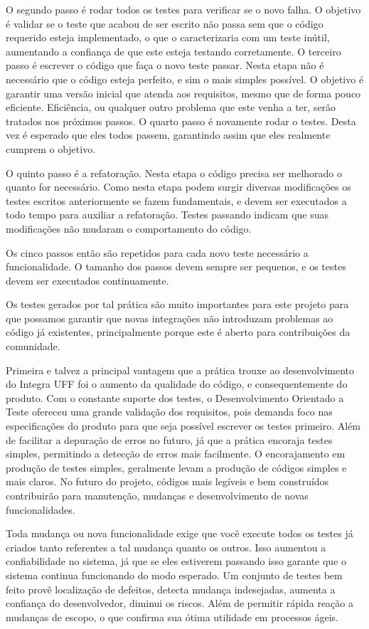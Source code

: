 O segundo passo é rodar todos os testes para verificar se o novo falha. O objetivo é validar se o teste que acabou de ser escrito não passa sem que o código requerido esteja implementado, o que o caracterizaria com um teste inútil, aumentando a confiança de que este esteja testando corretamente.
O terceiro passo é escrever o código que faça o novo teste passar. Nesta etapa não é necessário que o código esteja perfeito, e sim o mais simples possível. O objetivo é garantir uma versão inicial que atenda aos requisitos, mesmo que de forma pouco eficiente. Eficiência, ou qualquer outro problema que este venha a ter, serão tratados nos próximos passos.
O quarto passo é novamente rodar o testes. Desta vez é esperado que eles todos passem, garantindo assim que eles realmente cumprem o objetivo.

O quinto passo é a refatoração. Nesta etapa o código precisa ser melhorado o quanto for necessário. Como nesta etapa podem surgir diversas modificações os testes escritos anteriormente se fazem fundamentais, e devem ser executados a todo tempo para auxiliar a refatoração. Testes passando indicam que suas modificações não mudaram o comportamento do código.

Os cinco passos então são repetidos para cada novo teste necessário a funcionalidade. O tamanho dos passos devem sempre ser pequenos, e os testes devem ser executados continuamente.

Os testes gerados por tal prática são muito importantes para este projeto para que possamos garantir que novas integrações não introduzam problemas ao código já existentes, principalmente porque este é aberto para contribuições da comunidade. 

Primeira e talvez a principal vantagem que a prática trouxe ao desenvolvimento do Integra UFF foi o aumento da qualidade do código, e consequentemente do produto. Com o constante suporte dos testes, o Desenvolvimento Orientado a Teste ofereceu uma grande validação dos requisitos, pois demanda foco nas especificações do produto para que seja possível escrever os testes primeiro. Além de facilitar a depuração de erros no futuro, já que a prática encoraja testes simples, permitindo a detecção de erros mais facilmente. O encorajamento em produção de testes simples, geralmente levam a produção de códigos simples e mais claros. No futuro do projeto, códigos mais legíveis e bem construídos contribuirão para manutenção, mudanças e desenvolvimento de novas funcionalidades.

Toda mudança ou nova funcionalidade exige que você execute todos os testes já criados tanto referentes a tal mudança quanto os outros. Isso aumentou a confiabilidade no sistema, já que se eles estiverem passando isso garante que o sistema continua funcionando do modo esperado. Um conjunto de testes bem feito provê localização de defeitos, detecta mudança indesejadas, aumenta a confiança do desenvolvedor, diminui os riscos. Além de permitir rápida reação a mudanças de escopo, o que confirma sua ótima utilidade em processos ágeis.

